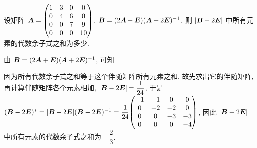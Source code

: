 \begin{example}
    设矩阵 $\vb*{A}=\mqty(1&3&0&0\\0&4&6&0\\0&0&7&9\\0&0&0&10),~\vb*{B}=(2\vb*{A}+\vb*{E})(\vb*{A}+2\vb*{E})^{-1}$, 则 $|\vb*{B}-2\vb*{E}|$ 中所有元素的代数余子式之和为多少.
\end{example}
\begin{solution}
    由 $\vb*{B}=(2\vb*{A}+\vb*{E})(\vb*{A}+2\vb*{E})^{-1}$, 可知
    因为所有代数余子式之和等于这个伴随矩阵所有元素之和, 故先求出它的伴随矩阵, 再计算伴随矩阵各个元素相加,
    $|\vb*{B}-2\vb*{E}|=\dfrac{1}{24}$, 于是
    $(\vb*{B}-2\vb*{E})^*=|\vb*{B}-2\vb*{E}|(\vb*{B}-2\vb*{E})^{-1}=\dfrac{1}{24}\mqty(-1&-1&0&0\\0&-2&-2&0\\0&0&-3&-3\\0&0&0&-4)$,
    因此 $|\vb*{B}-2\vb*{E}|$ 中所有元素的代数余子式之和为 $-\dfrac{2}{3}.$
\end{solution}

